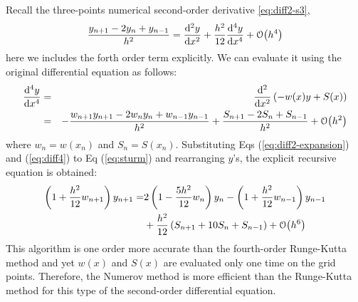 Recall the three-points numerical second-order derivative \eqref{eq:diff2-s3},
\begin{equation}
\frac{y_{n+1} - 2 y_n + y_{n-1} }{h^2} = \dv[2]{y}{x} 
+ \frac{h^2}{12} \dv[4]{y}{x} + \order{h^4}
\label{eq:diff2-expansion}
\end{equation}
here we includes the forth order term explicitly.  We can evaluate it  
using the original differential equation as follows:
\begin{eqnarray}
\dv[4]{y}{x} & = & \dv[2]{x} \left( -w(x) y + S(x) \right)\nonumber\\
& = & - \frac{ w_{n+1} y_{n+1} - 2 w_n y_n + w_{n-1} y_{n-1} }
{h^2} + \frac{S_{n+1} - 2 S_n + S_{n-1}} {h^2} + \order{h^2}
\label{eq:diff4}
\end{eqnarray}
where $w_n = w(x_n)$ and $S_n = S(x_n)$.
Substituting Eqs (\ref{eq:diff2-expansion}) and (\ref{eq:diff4}) to Eq (\ref{eq:sturm})
and rearranging $y$'s, the explicit recursive equation is obtained:
\begin{equation}
\begin{split}
\left(1 + \frac{h^2}{12} w_{n+1} \right) y_{n+1}  = &
2 \left( 1 - \frac{5h^2}{12} w_n \right) y_n 
- \left( 1 + \frac{h^2}{12} w_{n-1} \right) y_{n-1} \\
& +  \frac{h^2}{12} \left( S_{n+1} + 10 S_n + S_{n-1} \right) + \order{h^6}
\end{split}
\label{eq:numerov}
\end{equation}
This algorithm is one order more accurate than the fourth-order Runge-Kutta
method and yet $w(x)$ and $S(x)$ are evaluated only one time on the
grid points.  Therefore, the Numerov method is more efficient than
the Runge-Kutta method for this type of the second-order differential
equation.

